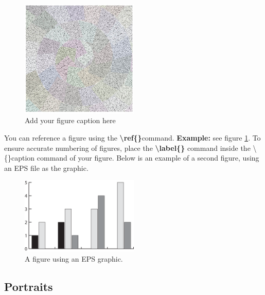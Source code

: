 \documentclass{csmagazine}
\begin{document}
\begin{figure}[H]
	\begin{center}	
		\includegraphics[width=0.5\textwidth]{figure_1.jpg}
		\caption{Add your figure caption here \label{fig:example_fig}}		
	\end{center}
\end{figure}

You can reference a figure using the \textbf{\textbackslash{}ref\{\}}command. \textbf{Example:} see figure \ref{fig:example_fig}. To ensure accurate numbering of figures, place the \textbf{\textbackslash{}label\{\}} command inside the \textbackslash{}\{\}caption command of your figure. Below is an example of a second figure, using an EPS file as the graphic.

\begin{figure}[H]
	\begin{center}	
		\includegraphics[width=0.5\textwidth]{figure_2.eps}
		\caption{A figure using an EPS graphic. \label{fig:example_fig2}}		
	\end{center}
\end{figure}


\subsection{Portraits}
\end{document}
